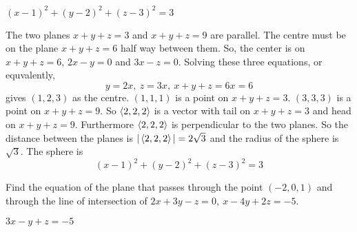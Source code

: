 
\begin{answer}
$(x-1)^2+(y-2)^2+(z-3)^2=3$
\end{answer}

\begin{solution}
The two planes $x+y+z=3$ and $x+y+z=9$ are parallel.
The centre must be on the plane $x+y+z=6$ half way between them.
So, the center is on $x+y+z=6$, $2x-y=0$ and $3x-z=0$. Solving these
three equations, or equvalently,
\begin{equation*}
y=2x,\ z=3x,\ x+y+z=6x=6
\end{equation*}
gives $(1,2,3)$ as the centre. $(1,1,1)$ is a point on
$x+y+z=3$. $(3,3,3)$ is a point on $x+y+z=9$. So $\left< 2,2,2\right>$ is a vector
with tail on $x+y+z=3$ and head on $x+y+z=9$. Furthermore $\left< 2,2,2\right>$
is perpendicular to the two planes. So the distance between the planes
is $|\left< 2,2,2\right>|=2\sqrt{3}$ and the radius of the sphere is $\sqrt{3}$. 
The sphere is
\begin{equation*}
(x-1)^2+(y-2)^2+(z-3)^2=3
\end{equation*}
\end{solution}


\begin{question}
Find the equation of the plane that passes through the point
$(-2,0,1)$ and through the line of intersection of $2x+3y-z=0,\ x-4y+2z=-5$.
\end{question}


\begin{answer}
$3x-y+z=-5$
\end{answer}

